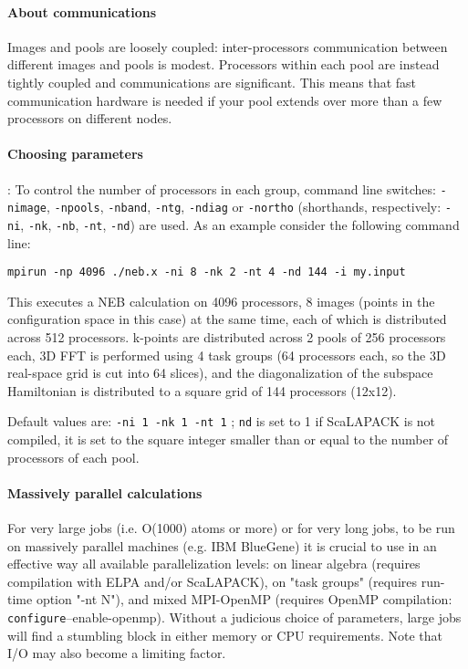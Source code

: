 \documentclass[12pt,a4paper]{article}
\def\configure{\texttt{configure}}
\begin{document}
\paragraph{About communications}
Images and pools are loosely coupled: inter-processors communication
between different images and pools is modest. Processors within each
pool are instead tightly coupled and communications are significant.
This means that fast communication hardware is needed if
your pool extends over more than a few processors on different nodes.

\paragraph{Choosing parameters}:
To control the number of processors in each group,
command line switches:
\texttt{-nimage}, \texttt{-npools}, \texttt{-nband},
\texttt{-ntg}, \texttt{-ndiag} or \texttt{-northo}
(shorthands, respectively: \texttt{-ni}, \texttt{-nk}, \texttt{-nb},
\texttt{-nt}, \texttt{-nd})
are used.
As an example consider the following command line:
\begin{verbatim}
mpirun -np 4096 ./neb.x -ni 8 -nk 2 -nt 4 -nd 144 -i my.input
\end{verbatim}
This executes a NEB calculation on 4096 processors, 8 images (points in the configuration
space in this case) at the same time, each of
which is distributed across 512 processors.
k-points are distributed across 2 pools of 256 processors each,
3D FFT is performed using 4 task groups (64 processors each, so
the 3D real-space grid is cut into 64 slices), and the diagonalization
of the subspace Hamiltonian is distributed to a square grid of 144
processors (12x12).

Default values are: \texttt{-ni 1 -nk 1 -nt 1} ;
\texttt{nd} is set to 1 if ScaLAPACK is not compiled,
it is set to the square integer smaller than or equal to the number of
processors of each pool.

\paragraph{Massively parallel calculations}
For very large jobs (i.e. O(1000) atoms or more) or for very long jobs,
to be run on massively parallel  machines (e.g. IBM BlueGene) it is
crucial to use in an effective way all available parallelization levels:
on linear algebra (requires compilation with ELPA and/or ScaLAPACK),
on "task groups" (requires run-time option "-nt N"), and mixed
MPI-OpenMP (requires OpenMP compilation: \configure --enable-openmp).
Without a judicious choice of parameters, large jobs will find a
stumbling block in either memory or CPU requirements. Note that I/O
may also become a limiting factor.
\end{document}

